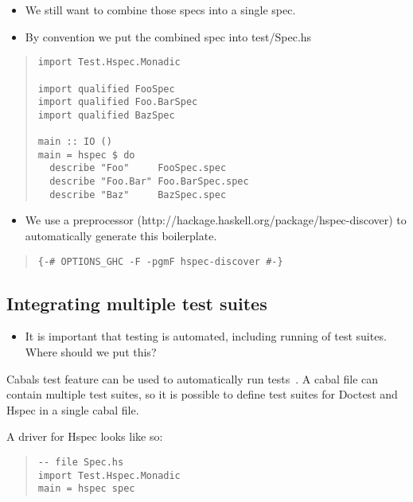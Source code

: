 \documentclass[preprint]{sigplanconf}
\begin{document}
\begin{itemize}
\item We still want to combine those specs into a single spec.
\item By convention we put the combined spec into test/Spec.hs
\end{itemize}

\begin{quote}
\small
\begin{verbatim}
import Test.Hspec.Monadic

import qualified FooSpec
import qualified Foo.BarSpec
import qualified BazSpec

main :: IO ()
main = hspec $ do
  describe "Foo"     FooSpec.spec
  describe "Foo.Bar" Foo.BarSpec.spec
  describe "Baz"     BazSpec.spec
\end{verbatim}
\end{quote}

\begin{itemize}
\item We use a preprocessor (http://hackage.haskell.org/package/hspec-discover) to automatically generate this boilerplate.
\end{itemize}

\begin{quote}
\small
\begin{verbatim}
{-# OPTIONS_GHC -F -pgmF hspec-discover #-}
\end{verbatim}
\end{quote}

\subsection{Integrating multiple test suites}

\begin{itemize}

\item It is important that testing is automated, including running of test
    suites.  Where should we put this?
\end{itemize}

\noindent Cabals test feature can be used to automatically run tests~\cite{cabal}.  A cabal
file can contain multiple test suites, so it is possible to define test suites
for Doctest and Hspec in a single cabal file.

A driver for Hspec looks like so:

\begin{quote}
\small
\begin{verbatim}
-- file Spec.hs
import Test.Hspec.Monadic
main = hspec spec
\end{verbatim}
\end{quote}
\end{document}
